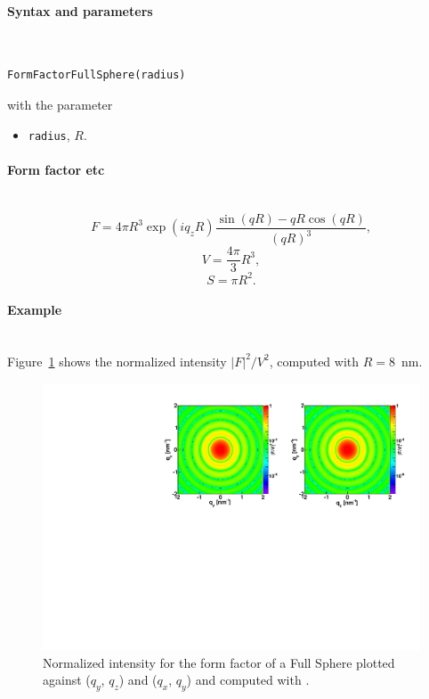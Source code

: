 \FloatBarrier

\paragraph{Syntax and parameters}\strut\\[-2ex plus .2ex minus .2ex]
\begin{lstlisting}[language=python, style=eclipseboxed,numbers=none,nolol]
  FormFactorFullSphere(radius)
\end{lstlisting}
with the parameter
\begin{itemize}
\item \texttt{radius}, $R$.
\end{itemize}


\paragraph{Form factor etc}\strut\\
\begin{equation*}
F = 4\pi R^3 \exp(iq_z R)\frac{\sin(q R) - q R \cos(q R)}{(qR)^3},
\end{equation*}
\begin{equation*}
  V = \dfrac{4\pi}{3}R^3,
\end{equation*}
\begin{equation*}
  S= \pi R^2.
\end{equation*}

\paragraph{Example}\strut\\
Figure~\ref{fig:FFfSphereEx} shows the normalized intensity $|F|^2/V^2$, computed with $R=8$~nm.
\begin{figure}[H]
\begin{center}
\includegraphics[angle=-90,width=\textwidth]{fig/ff/figfffsphere.pdf}
\end{center}
\caption{Normalized intensity for the
  form factor of a Full Sphere plotted against ($q_y$, $q_z$) and ($q_x$, $q_y$) and computed with .}
\label{fig:FFfSphereEx}
\end{figure}


